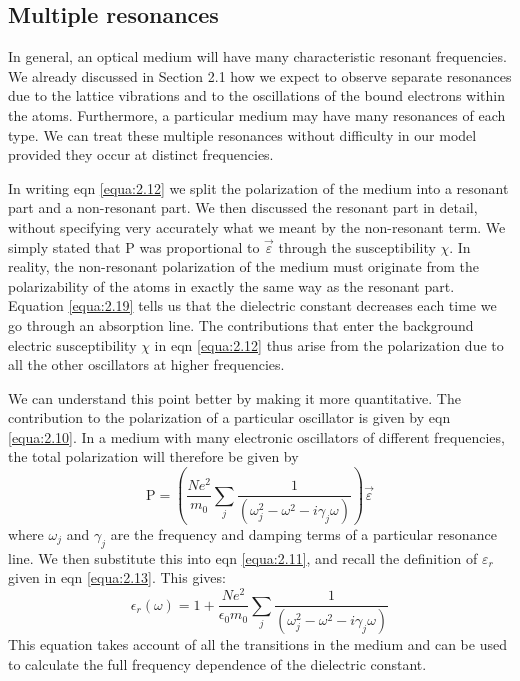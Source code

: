 \documentclass[12pt]{book}
\begin{document}
\subsection{Multiple resonances}

In general, an optical medium will have many characteristic resonant frequencies. We already discussed in Section 2.1 how we expect to observe separate resonances due to the lattice vibrations and to the oscillations of the bound electrons within the atoms. Furthermore, a particular medium may have many resonances of each type. We can treat these multiple resonances without difficulty in our model provided they occur at distinct frequencies.

In writing eqn \ref{equa:2.12} we split the polarization of the medium into a resonant part and a non-resonant part. We then discussed the resonant part in detail, without specifying very accurately what we meant by the non-resonant term. We simply stated that $\mathrm{P}$ was proportional to $\vec{\varepsilon}$ through the susceptibility $\chi$. In reality, the non-resonant polarization of the medium must originate from the polarizability of the atoms in exactly the same way as the resonant part. Equation \ref{equa:2.19} tells us that the dielectric constant decreases each time we go through an absorption line. The contributions that enter the background electric susceptibility $\chi$ in eqn \ref{equa:2.12} thus arise from the polarization due to all the other oscillators at higher frequencies.

We can understand this point better by making it more quantitative. The contribution to the polarization of a particular oscillator is given by eqn \ref{equa:2.10}. In a medium with many electronic oscillators of different frequencies, the total polarization will therefore be given by
\begin{equation}\label{equa:2.22}
  \mathrm{P}=\left(\frac{Ne^2}{m_0}\sum_j\frac{1}{(\omega_j^2-\omega^2-i\gamma_j\omega)}\right)\vec{\varepsilon}
\end{equation}
where $\omega_j$ and $\gamma_j$ are the frequency and damping terms of a particular resonance line. We then substitute this into eqn \ref{equa:2.11}, and recall the definition of $\varepsilon_r$ given in eqn \ref{equa:2.13}. This gives:
\begin{equation}\label{equa:2.23}
  \epsilon_r(\omega)=1+\frac{Ne^2}{\epsilon_0m_0}\sum_j\frac{1}{(\omega_j^2-\omega^2-i\gamma_j\omega)}
\end{equation}
This equation takes account of all the transitions in the medium and can be used to calculate the full frequency dependence of the dielectric constant.
\end{document}
